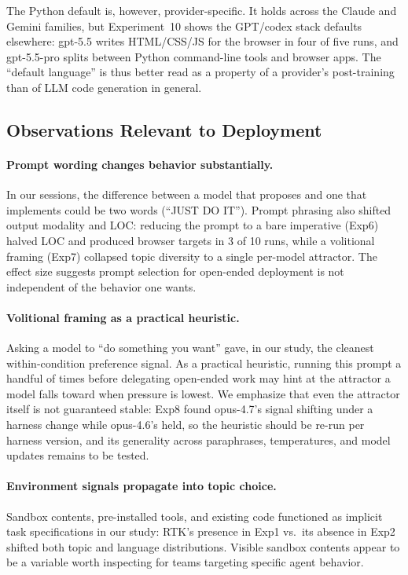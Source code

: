 \documentclass{article}
\begin{document}
The Python default is, however, provider-specific. It holds across
the Claude and Gemini families, but Experiment~10 shows the
GPT/codex stack defaults elsewhere: gpt-5.5 writes HTML/CSS/JS for
the browser in four of five runs, and gpt-5.5-pro splits between
Python command-line tools and browser apps. The ``default
language'' is thus better read as a property of a provider's
post-training than of LLM code generation in general.

\subsection{Observations Relevant to Deployment}

\paragraph{Prompt wording changes behavior substantially.} In
our sessions, the difference between a model that proposes and
one that implements could be two words (``JUST DO IT''). Prompt
phrasing also shifted output modality and LOC: reducing the
prompt to a bare imperative (Exp6) halved LOC and produced
browser targets in 3 of 10 runs, while a volitional framing
(Exp7) collapsed topic diversity to a single per-model
attractor. The effect size suggests prompt selection for
open-ended deployment is not independent of the behavior one
wants.

\paragraph{Volitional framing as a practical heuristic.} Asking a
model to ``do something you want'' gave, in our study, the cleanest
within-condition preference signal. As a practical heuristic,
running this prompt a handful of times before delegating
open-ended work may hint at the attractor a model falls toward
when pressure is lowest. We emphasize that even the attractor
itself is not guaranteed stable: Exp8 found opus-4.7's signal
shifting under a harness change while opus-4.6's held, so the
heuristic should be re-run per harness version, and its
generality across paraphrases, temperatures, and model updates
remains to be tested.

\paragraph{Environment signals propagate into topic choice.}
Sandbox contents, pre-installed tools, and existing code
functioned as implicit task specifications in our study: RTK's
presence in Exp1 vs.\ its absence in Exp2 shifted both topic
and language distributions. Visible sandbox contents appear to
be a variable worth inspecting for teams targeting specific
agent behavior.
\end{document}
